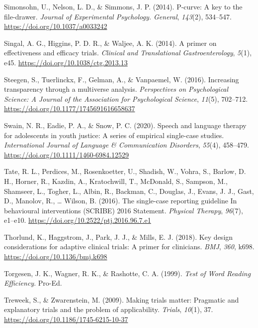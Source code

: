 \documentclass{krantz}
\newlength{\cslhangindent}
\newlength{\cslentryspacingunit} %
\newenvironment{CSLReferences}[2] %
{%
\setlength{\parindent}{0pt}
\ifodd #1
\let\oldpar\par
\def\par{\hangindent=\cslhangindent\oldpar}
\fi
\setlength{\parskip}{#2\cslentryspacingunit}
}%
{}
\begin{document}
\begin{CSLReferences}{1}{0}
\leavevmode{}%
Simonsohn, U., Nelson, L. D., \& Simmons, J. P. (2014). P-curve: A key to the file-drawer. \emph{Journal of Experimental Psychology. General}, \emph{143}(2), 534--547. \url{https://doi.org/10.1037/a0033242}

\leavevmode{}%
Singal, A. G., Higgins, P. D. R., \& Waljee, A. K. (2014). A primer on effectiveness and efficacy trials. \emph{Clinical and Translational Gastroenterology}, \emph{5}(1), e45. \url{https://doi.org/10.1038/ctg.2013.13}

\leavevmode{}%
Steegen, S., Tuerlinckx, F., Gelman, A., \& Vanpaemel, W. (2016). Increasing transparency through a multiverse analysis. \emph{Perspectives on Psychological Science: A Journal of the Association for Psychological Science}, \emph{11}(5), 702--712. \url{https://doi.org/10.1177/1745691616658637}

\leavevmode{}%
Swain, N. R., Eadie, P. A., \& Snow, P. C. (2020). Speech and language therapy for adolescents in youth justice: {A} series of empirical single-case studies. \emph{International Journal of Language \& Communication Disorders}, \emph{55}(4), 458--479. \url{https://doi.org/10.1111/1460-6984.12529}

\leavevmode{}%
Tate, R. L., Perdices, M., Rosenkoetter, U., Shadish, W., Vohra, S., Barlow, D. H., Horner, R., Kazdin, A., Kratochwill, T., McDonald, S., Sampson, M., Shamseer, L., Togher, L., Albin, R., Backman, C., Douglas, J., Evans, J. J., Gast, D., Manolov, R., \ldots{} Wilson, B. (2016). The single-case reporting guideline {In} behavioural interventions ({SCRIBE}) 2016 {Statement}. \emph{Physical Therapy}, \emph{96}(7), e1--e10. \url{https://doi.org/10.2522/ptj.2016.96.7.e1}

\leavevmode{}%
Thorlund, K., Haggstrom, J., Park, J. J., \& Mills, E. J. (2018). Key design considerations for adaptive clinical trials: A primer for clinicians. \emph{BMJ}, \emph{360}, k698. \url{https://doi.org/10.1136/bmj.k698}

\leavevmode{}%
Torgesen, J. K., Wagner, R. K., \& Rashotte, C. A. (1999). \emph{Test of {Word Reading Efficiency}}. {Pro-Ed}.

\leavevmode{}%
Treweek, S., \& Zwarenstein, M. (2009). Making trials matter: Pragmatic and explanatory trials and the problem of applicability. \emph{Trials}, \emph{10}(1), 37. \url{https://doi.org/10.1186/1745-6215-10-37}


\end{CSLReferences}
\end{document}
